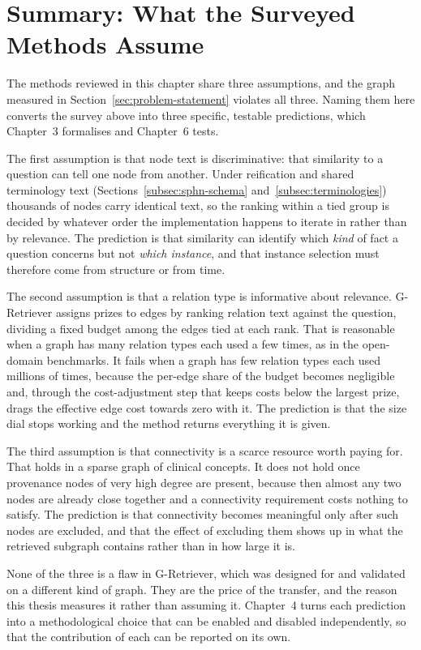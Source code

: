 \section{Summary: What the Surveyed Methods Assume} \label{sec:background-summary}

The methods reviewed in this chapter share three assumptions, and the graph
measured in Section~\ref{sec:problem-statement} violates all three. Naming them
here converts the survey above into three specific, testable predictions, which
Chapter~3 formalises and Chapter~6 tests.

The first assumption is that node text is discriminative: that similarity to a
question can tell one node from another. Under reification and shared terminology
text (Sections~\ref{subsec:sphn-schema} and~\ref{subsec:terminologies}) thousands
of nodes carry identical text, so the ranking within a tied group is decided by
whatever order the implementation happens to iterate in rather than by relevance.
The prediction is that similarity can identify which \emph{kind} of fact a
question concerns but not \emph{which instance}, and that instance selection must
therefore come from structure or from time.

The second assumption is that a relation type is informative about relevance.
G-Retriever assigns prizes to edges by ranking relation text against the
question, dividing a fixed budget among the edges tied at each rank. That is
reasonable when a graph has many relation types each used a few times, as in the
open-domain benchmarks. It fails when a graph has few relation types each used
millions of times, because the per-edge share of the budget becomes negligible
and, through the cost-adjustment step that keeps costs below the largest prize,
drags the effective edge cost towards zero with it. The prediction is that the
size dial stops working and the method returns everything it is given.

The third assumption is that connectivity is a scarce resource worth paying for.
That holds in a sparse graph of clinical concepts. It does not hold once
provenance nodes of very high degree are present, because then almost any two
nodes are already close together and a connectivity requirement costs nothing to
satisfy. The prediction is that connectivity becomes meaningful only after such
nodes are excluded, and that the effect of excluding them shows up in what the
retrieved subgraph contains rather than in how large it is.

None of the three is a flaw in G-Retriever, which was designed for and validated
on a different kind of graph. They are the price of the transfer, and the reason
this thesis measures it rather than assuming it. Chapter~4 turns each prediction
into a methodological choice that can be enabled and disabled independently, so
that the contribution of each can be reported on its own.
